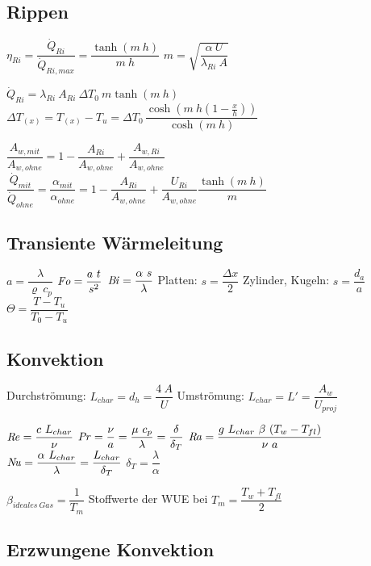 \clearpage

\subsection{Rippen}
	$ \eta_{Ri} = \dfrac{\dot{Q}_{Ri}}{\dot{Q}_{Ri,max}} = \dfrac{\tanh(m\ h)}{m\ h} $
		\qquad $ m = \sqrt{\dfrac{\alpha\ U}{\lambda_{Ri}\ A}} $

	$ \dot{Q}_{Ri} = \lambda_{Ri}\ A_{Ri}\ \Delta T_0\ m \tanh(m\ h) $
		\qquad  $ \Delta T_{(x)} = T_{(x)} - T_u = \Delta T_0\, \dfrac{\cosh\left(m\ h \left(1- \frac{x}{h}\right)\right)}{\cosh(m\ h)} $

	$ \dfrac{A_{w,mit}}{A_{w,ohne}} = 1 - \dfrac{A_{Ri}}{A_{w,ohne}} + \dfrac{A_{w,Ri}}{A_{w,ohne}} $
		\qquad\qquad $ \dfrac{\dot{Q}_{mit}}{\dot{Q}_{ohne}} = \dfrac{\alpha_{mit}}{\alpha_{ohne}} = 1 - \dfrac{A_{Ri}}{A_{w,ohne}}  + \dfrac{U_{Ri}}{A_{w,ohne}} \dfrac{\tanh(m\ h)}{m}$

\subsection{Transiente Wärmeleitung}
	$ a = \dfrac{\lambda}{\varrho\ c_p} $
		\quad $ \operatorname{\mathit{F\kern-.10em o}} = \dfrac{a\ t}{s^2} $
		\quad $ \operatorname{\mathit{B\kern-.10em i}} = \dfrac{\alpha\ s}{\lambda} $
		\quad Platten: $ s = \dfrac{\Delta x}{2} $
		\quad Zylinder, Kugeln: $ s = \dfrac{d_a}{a} $
		\quad $\Theta = \dfrac{T - T_u}{T_0 - T_u}  $

\subsection{Konvektion}
	Durchströmung: $ L_{char} = d_h = \dfrac{4\ A}{U} $ \qquad Umströmung: $ L_{char} = L' = \dfrac{A_w}{U_{proj}}$

	$ \operatorname{\mathit{R\kern-.10em e}} = \dfrac{c\ L_{char}}{\nu} $
		\quad $ \Pran = \dfrac{\nu}{a} = \dfrac{\mu\ c_p}{\lambda} = \dfrac{\delta}{\delta_T} $
		\quad $ \operatorname{\mathit{R\kern-.10em a}} = \dfrac{g\ L_{char}\ \beta\ (T_w - T_{fl})}  {\nu\ a} $
		\quad $ \operatorname{\mathit{N\kern-.20em u}} = \dfrac{\alpha\ L_{char}}{\lambda} = \dfrac{L_{char}}{\delta_T} $
		\quad $ \delta_T = \dfrac{\lambda}{\alpha} $

	$ \beta_{ideales~Gas} = \dfrac{1}{T_m} $
		\qquad Stoffwerte der WUE bei $ T_m = \dfrac{T_w + T_{fl}}{2} $


\subsection{Erzwungene Konvektion}
